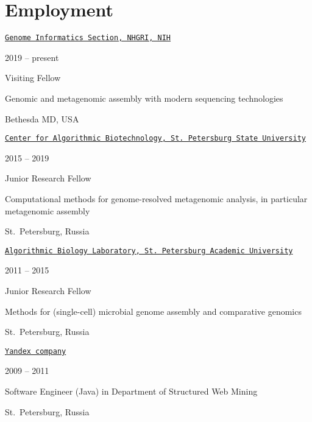 
\section{Employment}
\href{https://genomeinformatics.github.io/}{\tt Genome Informatics Section, NHGRI, NIH}
\begin{innerlist}
  \item 2019 -- present
  \item Visiting Fellow
  \item Genomic and metagenomic assembly with modern sequencing technologies
  \item Bethesda MD, USA
\end{innerlist}

\blankline

\href{http://cab.spbu.ru/}{\tt Center for Algorithmic Biotechnology, St.~Petersburg State University}
\begin{innerlist}
  \item 2015 -- 2019
  \item Junior Research Fellow
  \item Computational methods for genome-resolved metagenomic analysis, in particular metagenomic assembly
  \item St.~Petersburg, Russia
\end{innerlist}

\blankline

\href{http://bioinf.spbau.ru}{\tt Algorithmic Biology Laboratory, St.~Petersburg Academic University}
\begin{innerlist}
  \item 2011 -- 2015
  \item Junior Research Fellow
  \item Methods for (single-cell) microbial genome assembly and comparative genomics
  \item St.~Petersburg, Russia
\end{innerlist}

\blankline

\href{http://company.yandex.com/}{\tt Yandex company}%
\begin{innerlist}
  \item 2009 -- 2011
  \item Software Engineer (Java) in Department of Structured Web Mining
  \item St.~Petersburg, Russia
\end{innerlist}

